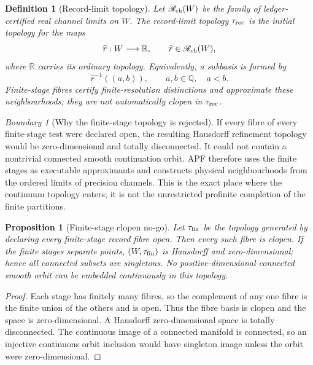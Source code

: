 \documentclass[11pt]{article}
\newtheorem{proposition}[theorem]{Proposition}
\newtheorem{definition}[theorem]{Definition}
\theoremstyle{remark}
\newtheorem{warning}[theorem]{Boundary}
\begin{document}
\begin{definition}[Record-limit topology]
\label{def:record-limit-topology}
Let $\mathscr R_{\rm ch}(W)$ be the family of ledger-certified real channel
limits on $W$.  The \emph{record-limit topology} $\tau_{\rm rec}$ is the
initial topology for the maps
\[
        \widehat r:W\longrightarrow\mathbb R,
        \qquad \widehat r\in\mathscr R_{\rm ch}(W),
\]
where $\mathbb R$ carries its ordinary topology.  Equivalently, a subbasis is
formed by
\[
        \widehat r^{-1}((a,b)),
        \qquad a,b\in\mathbb Q,
        \quad a<b.
\]
Finite-stage fibres certify finite-resolution distinctions and approximate
these neighbourhoods; they are not automatically clopen in $\tau_{\rm rec}$.
\end{definition}

\begin{warning}[Why the finite-stage topology is rejected]
If every fibre of every finite-stage test were declared open, the resulting
Hausdorff refinement topology would be zero-dimensional and totally
disconnected.  It could not contain a nontrivial connected smooth continuation
orbit.  APF therefore uses the finite stages as executable approximants and
constructs physical neighbourhoods from the ordered limits of precision
channels.  This is the exact place where the continuum topology enters; it is
not the unrestricted profinite completion of the finite partitions.
\end{warning}

\begin{proposition}[Finite-stage clopen no-go]
\label{prop:finite-stage-clopen-no-go}
Let $\tau_{\rm fin}$ be the topology generated by declaring every finite-stage
record fibre open.  Then every such fibre is clopen.  If the finite stages
separate points, $(W,\tau_{\rm fin})$ is Hausdorff and zero-dimensional; hence
all connected subsets are singletons.  No positive-dimensional connected
smooth orbit can be embedded continuously in this topology.
\end{proposition}

\begin{proof}
Each stage has finitely many fibres, so the complement of any one fibre is the
finite union of the others and is open.  Thus the fibre basis is clopen and the
space is zero-dimensional.  A Hausdorff zero-dimensional space is totally
disconnected.  The continuous image of a connected manifold is connected, so
an injective continuous orbit inclusion would have singleton image unless the
orbit were zero-dimensional.
\end{proof}
\end{document}
